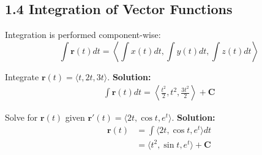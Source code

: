 \subsection*{1.4 Integration of Vector Functions}

\begin{conceptbox}
    Integration is performed component-wise:
    \begin{equation*}
        \int \mathbf{r}(t) dt = \left\langle \int x(t)dt, \int y(t)dt, \int z(t)dt \right\rangle
    \end{equation*}
\end{conceptbox}

\begin{examplebox}
    Integrate $\mathbf{r}(t)=\langle t, 2t, 3t\rangle$.
    \newline \textbf{Solution:}
    \begin{align*}
        \int \mathbf{r}(t)dt
        = \left\langle \frac{t^2}{2}, t^2, \frac{3t^2}{2} \right\rangle + \mathbf{C}
    \end{align*}
\end{examplebox}

\begin{examplebox}
    Solve for $\mathbf{r}(t)$ given $\mathbf{r}'(t)=\langle 2t, \cos t, e^t\rangle$.
    \newline \textbf{Solution:}
    \begin{align*}
        \mathbf{r}(t) & = \int \langle 2t, \cos t, e^t \rangle dt       \\
                      & = \langle t^2, \sin t, e^t \rangle + \mathbf{C}
    \end{align*}
\end{examplebox}